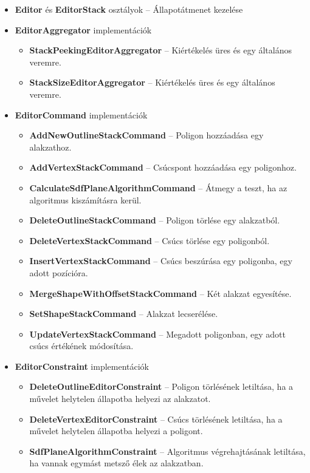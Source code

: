 \begin{itemize}
    \item \textbf{Editor} és \textbf{EditorStack} osztályok -- Állapotátmenet kezelése
    \item \textbf{EditorAggregator} implementációk
    \begin{itemize}
        \item \textbf{StackPeekingEditorAggregator} -- Kiértékelés üres és egy általános veremre.
        \item \textbf{StackSizeEditorAggregator} -- Kiértékelés üres és egy általános veremre.
    \end{itemize}
    \item \textbf{EditorCommand} implementációk
    \begin{itemize}
        \item \textbf{AddNewOutlineStackCommand} -- Poligon hozzáadása egy alakzathoz.
        \item \textbf{AddVertexStackCommand} -- Csúcspont hozzáadása egy poligonhoz.
        \item \textbf{CalculateSdfPlaneAlgorithmCommand} -- Átmegy a teszt, ha az algoritmus kiszámításra kerül.
        \item \textbf{DeleteOutlineStackCommand} -- Poligon törlése egy alakzatból.
        \item \textbf{DeleteVertexStackCommand} -- Csúcs törlése egy poligonból.
        \item \textbf{InsertVertexStackCommand} -- Csúcs beszúrása egy poligonba, egy adott pozícióra.
        \item \textbf{MergeShapeWithOffsetStackCommand} -- Két alakzat egyesítése.
        \item \textbf{SetShapeStackCommand} -- Alakzat lecserélése.
        \item \textbf{UpdateVertexStackCommand} -- Megadott poligonban, egy adott csúcs értékének módosítása.
    \end{itemize}
    \item \textbf{EditorConstraint} implementációk
    \begin{itemize}
        \item \textbf{DeleteOutlineEditorConstraint} -- Poligon törlésének letiltása, ha a művelet helytelen állapotba helyezi az alakzatot.
        \item \textbf{DeleteVertexEditorConstraint} -- Csúcs törlésének letiltása, ha a művelet helytelen állapotba helyezi a poligont.
        \item \textbf{SdfPlaneAlgorithmConstraint} -- Algoritmus végrehajtásának letiltása, ha vannak egymást metsző élek az alakzatban.

\end{itemize}
\end{itemize}
